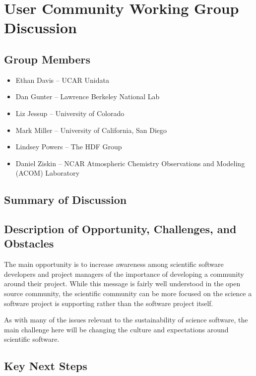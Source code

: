 \section{User Community Working Group Discussion}
\label{sec:appendix_user_community}


\subsection{Group Members}

\begin{itemize}
\item Ethan Davis -- UCAR Unidata
\item Dan Gunter -- Lawrence Berkeley National Lab
\item Liz Jessup -- University of Colorado
\item Mark Miller -- University of California, San Diego
\item Lindsey Powers -- The HDF Group
\item Daniel Ziskin -- NCAR Atmospheric Chemistry Observations and Modeling (ACOM) Laboratory
\end{itemize}

\subsection{Summary of Discussion}

\subsection{Description of Opportunity, Challenges, and Obstacles}

The main opportunity is to increase awareness among scientific
software developers and project managers of the importance of
developing a community around their project.
While this message is fairly well understood in the open source
community, the scientific community can be more focused on the
science a software project is supporting rather than the software
project itself.

As with many of the issues relevant to the sustainability of science
software, the main challenge here will be changing the culture and
expectations around scientific software.

\subsection{Key Next Steps}

